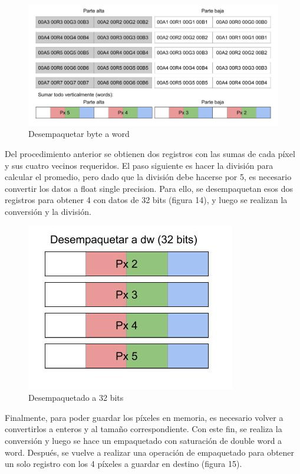 \documentclass[a4paper]{article}
\begin{document}
\begin{figure}[h]
  \begin{center}
	\includegraphics[scale=0.3]{img/zigzag/FilasPares2.jpg}
	\caption{Desempaquetar byte a word}
  \end{center}
\end{figure}

\pagebreak

Del procedimiento anterior se obtienen dos registros con las sumas de cada píxel y sus cuatro vecinos requeridos. El paso siguiente es hacer la división para calcular el promedio, pero dado que la división debe hacerse por 5, es necesario convertir los datos a float single precision. Para ello, se desempaquetan esos dos registros para obtener 4 con datos de 32 bits (figura 14), y luego se realizan la conversión y la división.

\begin{figure}[!htb]
  \begin{center}
	\includegraphics[scale=0.4]{img/zigzag/FilasPares3.jpg}
	\caption{Desempaquetado a 32 bits}
  \end{center}
\end{figure}

Finalmente, para poder guardar los píxeles en memoria, es necesario volver a convertirlos a enteros y al tamaño correspondiente. Con este fin, se realiza la conversión y luego se hace un empaquetado con saturación de double word a word. Después, se vuelve a realizar una operación de empaquetado para obtener un solo registro con los 4 píxeles a guardar en destino (figura 15).
\end{document}
